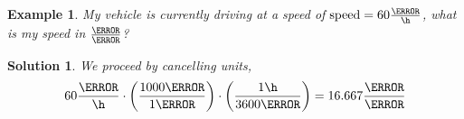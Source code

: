 \documentclass[12pt]{article}
\theoremstyle{break}
\newtheorem{ex}[thm]{Example}
\newtheorem*{soln}{Solution}
\begin{document}
\begin{ex}
My vehicle is currently driving at a speed of $\text{speed} = 60\frac{\km}{\h}$, what is my speed in $\frac{\m}{\s}$?
\end{ex}
\begin{soln}
We proceed by cancelling units,
	$$ 60\frac{\km}{\h} \cdot \left(\frac{1000\m}{1\km}\right) \cdot \left(\frac{1\h}{3600\s} \right) = 16.667 \frac{\m}{\s}$$
\end{soln}
\end{document}
